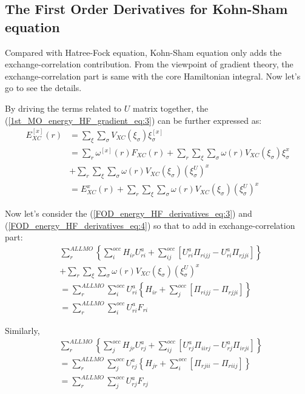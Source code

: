 \subsection{The First Order Derivatives for Kohn-Sham equation}
%
%
%
Compared with Hatree-Fock equation, Kohn-Sham equation only adds the
exchange-correlation contribution. From the viewpoint of gradient theory, the
exchange-correlation part is same with the core Hamiltonian integral. Now let's
go to see the details.

By driving the terms related to $U$ matrix together, the
(\ref{1st_MO_energy_HF_gradient_eq:3}) can be further expressed as:
\begin{align}
E^{[x]}_{XC}(r)
&=  \sum_{\xi}\sum_{\sigma} V_{XC}(\xi_{\sigma})\xi_{\sigma}^{[x]} \nonumber \\
&=  \sum_{r}\omega^{[x]}(r)F_{XC}(r) + \sum_{r}\sum_{\xi}\sum_{\sigma}
\omega(r) V_{XC}(\xi_{\sigma})\xi_{\sigma}^{x} \nonumber \\
&+ \sum_{r}\sum_{\xi}\sum_{\sigma}
\omega(r) V_{XC}(\xi_{\sigma})(\xi^{U}_{\sigma})^{x} \nonumber \\
&= E^{x}_{XC}(r) + \sum_{r}\sum_{\xi}\sum_{\sigma}
\omega(r) V_{XC}(\xi_{\sigma})(\xi^{U}_{\sigma})^{x}
 \label{FOD_energy_KS_derivatives_eq:1}
\end{align}

Now let's consider the (\ref{FOD_energy_HF_derivatives_eq:3}) and
(\ref{FOD_energy_HF_derivatives_eq:4}) so that to add in exchange-correlation
part:
\begin{align}
\label{FOD_energy_KS_derivatives_eq:2}
 &\sum_{r}^{ALL MO}\left\lbrace  \sum_{i}^{occ}H_{ir}U^{a}_{ri} +
\sum_{ij}^{occ}\left[ U^{a}_{ri}\Pi_{rijj} - U^{a}_{ri}\Pi_{rjji}\right] 
\right\rbrace  \nonumber \\
&+ \sum_{r}\sum_{\xi}\sum_{\sigma}
\omega(r) V_{XC}(\xi_{\sigma})(\xi^{U}_{\sigma})^{x}\nonumber \\
&= \sum_{r}^{ALL MO}\sum_{i}^{occ}U^{a}_{ri}\left\lbrace H_{ir} + 
\sum_{j}^{occ} \left[ \Pi_{rijj} - \Pi_{rjji}\right]  \right\rbrace \nonumber \\
&= \sum_{r}^{ALL MO}\sum_{i}^{occ}U^{a}_{ri}F_{ri} 
\end{align}

Similarly,
\begin{align}
 \label{FOD_energy_HF_derivatives_eq:4}
&\sum_{r}^{ALL MO}\left\lbrace  \sum_{j}^{occ}H_{jr}U^{a}_{rj} +
\sum_{ij}^{occ}\left[ U^{a}_{rj}\Pi_{iirj} - U^{a}_{rj}\Pi_{irji}\right] 
\right\rbrace \nonumber \\
&= \sum_{r}^{ALL MO}\sum_{j}^{occ}U^{a}_{rj}\left\lbrace H_{jr} +
\sum_{i}^{occ}\left[\Pi_{rjii} - \Pi_{riij}\right] 
\right\rbrace \nonumber \\ 
&= \sum_{r}^{ALL MO}\sum_{j}^{occ}U^{a}_{rj}F_{rj}
\end{align}



